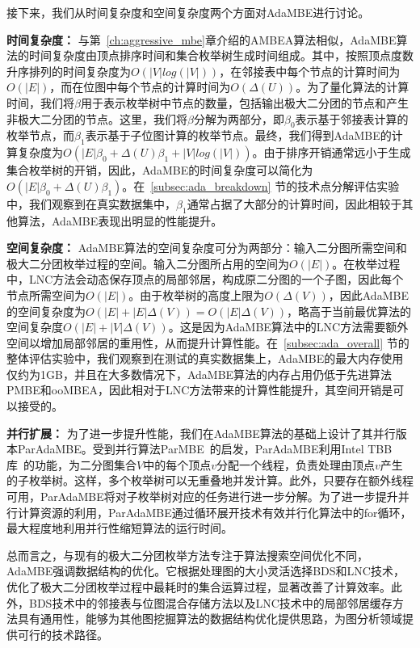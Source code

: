接下来，我们从时间复杂度和空间复杂度两个方面对AdaMBE进行讨论。

\textbf{时间复杂度：} 与第~\ref{ch:aggressive_mbe}章介绍的AMBEA算法相似，AdaMBE算法的时间复杂度由顶点排序时间和集合枚举树生成时间组成。其中，按照顶点度数升序排列的时间复杂度为$O(|V|log(|V|))$，在邻接表中每个节点的计算时间为$O(|E|)$，而在位图中每个节点的计算时间为$O(\Delta(U))$。为了量化算法的计算时间，我们将$\beta$用于表示枚举树中节点的数量，包括输出极大二分团的节点和产生非极大二分团的节点。这里，我们将$\beta$分解为两部分，即$\beta_0$表示基于邻接表计算的枚举节点，而$\beta_1$表示基于子位图计算的枚举节点。最终，我们得到AdaMBE的计算复杂度为$O(|E|\beta_0 + \Delta(U)\beta_1 + |V|log(|V|))$。由于排序开销通常远小于生成集合枚举树的开销，因此，AdaMBE的时间复杂度可以简化为$O(|E|\beta_0 + \Delta(U)\beta_1 )$。在~\ref{subsec:ada_breakdown} 节的技术点分解评估实验中，我们观察到在真实数据集中，$\beta_1$通常占据了大部分的计算时间，因此相较于其他算法，AdaMBE表现出明显的性能提升。

\textbf{空间复杂度：} AdaMBE算法的空间复杂度可分为两部分：输入二分图所需空间和极大二分团枚举过程的空间。输入二分图所占用的空间为$O(|E|)$。在枚举过程中，LNC方法会动态保存顶点的局部邻居，构成原二分图的一个子图，因此每个节点所需空间为$O(|E|)$。由于枚举树的高度上限为$O(\Delta(V))$，因此AdaMBE的空间复杂度为$O(|E|+|E|\Delta(V)) = O(|E|\Delta(V))$，略高于当前最优算法的空间复杂度$O(|E|+|V|\Delta(V))$。这是因为AdaMBE算法中的LNC方法需要额外空间以增加局部邻居的重用性，从而提升计算性能。在~\ref{subsec:ada_overall} 节的整体评估实验中，我们观察到在测试的真实数据集上，AdaMBE的最大内存使用仅约为1GB，并且在大多数情况下，AdaMBE算法的内存占用仍低于先进算法PMBE和ooMBEA，因此相对于LNC方法带来的计算性能提升，其空间开销是可以接受的。

\textbf{并行扩展：} 为了进一步提升性能，我们在AdaMBE算法的基础上设计了其并行版本ParAdaMBE。受到并行算法ParMBE~\cite{parMBE19}的启发，ParAdaMBE利用Intel TBB库~\cite{tbb-code}的功能，为二分图集合$V$中的每个顶点$v$分配一个线程，负责处理由顶点$v$产生的子枚举树。这样，多个枚举树可以无重叠地并发计算。此外，只要存在额外线程可用，ParAdaMBE将对子枚举树对应的任务进行进一步分解。为了进一步提升并行计算资源的利用，ParAdaMBE通过循环展开技术有效并行化算法中的for循环，最大程度地利用并行性缩短算法的运行时间。

总而言之，与现有的极大二分团枚举方法专注于算法搜索空间优化不同，AdaMBE强调数据结构的优化。它根据处理图的大小灵活选择BDS和LNC技术，优化了极大二分团枚举过程中最耗时的集合运算过程，显著改善了计算效率。此外，BDS技术中的邻接表与位图混合存储方法以及LNC技术中的局部邻居缓存方法具有通用性，能够为其他图挖掘算法的数据结构优化提供思路，为图分析领域提供可行的技术路径。











